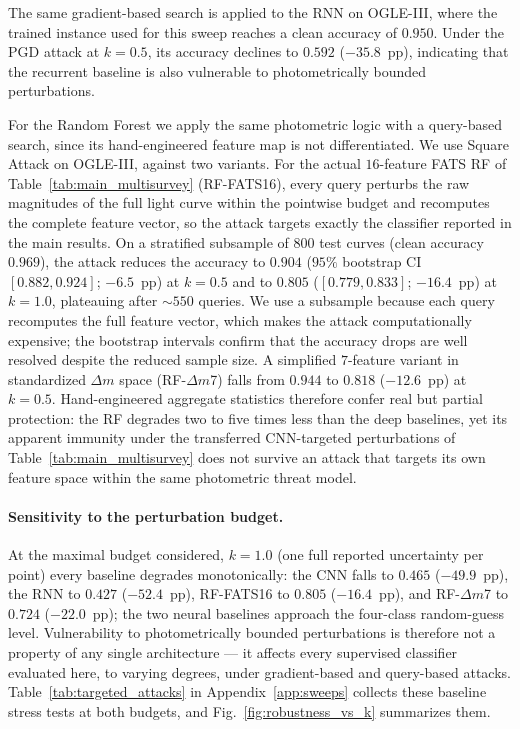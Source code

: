 \documentclass{aa}
\begin{document}
The same gradient-based search is applied to the RNN on OGLE-III, where the
trained instance used for this sweep reaches a clean accuracy of $0.950$.
Under the PGD attack at $k = 0.5$, its accuracy declines to $0.592$
($-35.8$~pp), indicating that the recurrent baseline is also vulnerable to
photometrically bounded perturbations.

For the Random Forest we apply the same photometric logic with a query-based search, since its hand-engineered feature map is not differentiated. We use Square Attack \citep{andriushchenko2020square} on OGLE-III, against two variants. For the actual $16$-feature FATS RF of
Table~\ref{tab:main_multisurvey} (RF-FATS16), every query perturbs the raw magnitudes of the full light curve within the pointwise budget and
recomputes the complete feature vector, so the attack targets exactly the
classifier reported in the main results. On a stratified subsample of
$800$ test curves (clean accuracy $0.969$), the attack reduces the
accuracy to $0.904$ ($95\%$ bootstrap CI $[0.882, 0.924]$; $-6.5$~pp) at
$k = 0.5$ and to $0.805$ ($[0.779, 0.833]$; $-16.4$~pp)
at $k = 1.0$, plateauing after ${\sim}550$ queries. We use a subsample because each query recomputes the full feature vector, which makes the attack computationally expensive; the bootstrap intervals confirm that the accuracy drops are well resolved despite the reduced sample size. A simplified $7$-feature variant in standardized $\Delta m$ space (RF-$\Delta m$7)
falls from $0.944$ to $0.818$ ($-12.6$~pp) at $k=0.5$. Hand-engineered
aggregate statistics therefore confer real but partial protection: the
RF degrades two to five times less than the deep baselines, yet its
apparent immunity under the transferred CNN-targeted perturbations
of Table~\ref{tab:main_multisurvey} does not survive an attack that
targets its own feature space within the same photometric threat model.

\paragraph{Sensitivity to the perturbation budget.}
At the maximal budget considered, $k = 1.0$ (one full reported uncertainty
per point) every baseline degrades monotonically: the CNN falls to $0.465$
($-49.9$~pp), the RNN to $0.427$ ($-52.4$~pp), RF-FATS16 to $0.805$
($-16.4$~pp), and RF-$\Delta m$7 to $0.724$ ($-22.0$~pp); the two neural
baselines approach the four-class random-guess level. Vulnerability to
photometrically bounded perturbations is therefore not a property of any
single architecture --- it affects every supervised classifier evaluated
here, to varying degrees, under gradient-based and query-based attacks.
Table~\ref{tab:targeted_attacks} in Appendix~\ref{app:sweeps} collects these
baseline stress tests at both budgets, and
Fig.~\ref{fig:robustness_vs_k} summarizes them.
\end{document}
